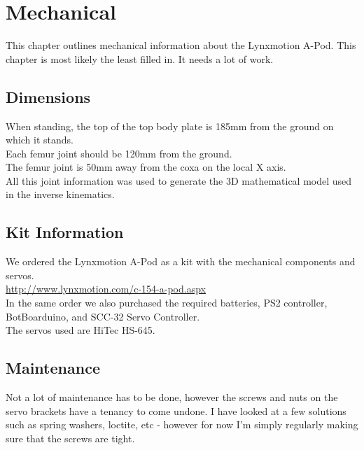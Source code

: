 	\chapter{Mechanical}
		This chapter outlines mechanical information about the Lynxmotion A-Pod. This chapter is most likely the least filled in. It needs a lot of work.

		\section{Dimensions}
			When standing, the top of the top body plate is 185mm from the ground on which it stands.\\
			
			Each femur joint should be 120mm from the ground.\\
			
			The femur joint is 50mm away from the coxa on the local X axis.\\
            
            All this joint information was used to generate the 3D mathematical model used in the inverse kinematics.\\
                        
		\section{Kit Information}
			We ordered the Lynxmotion A-Pod as a kit with the mechanical components and servos.\\
			
			\url{http://www.lynxmotion.com/c-154-a-pod.aspx}\\
			
			In the same order we also purchased the required batteries, PS2 controller, BotBoarduino, and SCC-32 Servo Controller.\\
			
			The servos used are HiTec HS-645.\\
			\pagebreak
            
        \section{Maintenance}
        	Not a lot of maintenance has to be done, however the screws and nuts on the servo brackets have a tenancy to come undone. I have looked at a few solutions such as spring washers, loctite, etc - however for now I'm simply regularly making sure that the screws are tight.\\
            
